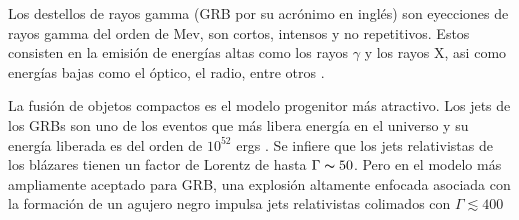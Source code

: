 \documentclass[12pt,a4paper]{book}
\begin{document}


Los destellos de rayos gamma (GRB por su acrónimo en inglés) son eyecciones de rayos gamma del orden de Mev, son cortos, intensos y no repetitivos.
Estos consisten en la emisión de energías altas como los rayos $\gamma$ y los rayos X, asi como energías bajas como el óptico, el radio, entre otros \cite{PGRB-piran}. %


La fusión de objetos compactos es el modelo progenitor más atractivo.
Los jets de los  GRBs son uno de los eventos que más libera energía en el universo y su energía liberada es del orden de $10^{52}$ ergs \cite{Berger:2013jza}.
Se infiere que los jets relativistas de los blázares tienen un factor de Lorentz de hasta $\Gamma \thicksim 50$. 
Pero en el modelo más ampliamente aceptado para GRB, una explosión altamente enfocada asociada con la formación de un agujero negro impulsa jets relativistas colimados con $\Gamma \lesssim 400$ 
\end{document}
